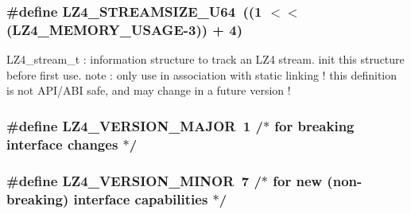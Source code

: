 \subsubsection[{L\+Z4\+\_\+\+S\+T\+R\+E\+A\+M\+S\+I\+Z\+E\+\_\+\+U64}]{\setlength{\rightskip}{0pt plus 5cm}\#define L\+Z4\+\_\+\+S\+T\+R\+E\+A\+M\+S\+I\+Z\+E\+\_\+\+U64~((1 $<$$<$ ({\bf L\+Z4\+\_\+\+M\+E\+M\+O\+R\+Y\+\_\+\+U\+S\+A\+G\+E}-\/3)) + 4)}\label{compat-lz4_8h_acddbce79f3e1d413f295e97d986ab3f5}
L\+Z4\+\_\+stream\+\_\+t \+: information structure to track an L\+Z4 stream. init this structure before first use. note \+: only use in association with static linking ! this definition is not A\+P\+I/\+A\+B\+I safe, and may change in a future version ! \hypertarget{compat-lz4_8h_a4a15eb1f8aa69834f917a50d7652413e}{}
\subsubsection[{L\+Z4\+\_\+\+V\+E\+R\+S\+I\+O\+N\+\_\+\+M\+A\+J\+O\+R}]{\setlength{\rightskip}{0pt plus 5cm}\#define L\+Z4\+\_\+\+V\+E\+R\+S\+I\+O\+N\+\_\+\+M\+A\+J\+O\+R~1    /$\ast$ for breaking interface changes  $\ast$/}\label{compat-lz4_8h_a4a15eb1f8aa69834f917a50d7652413e}
\hypertarget{compat-lz4_8h_af16952f74f68ac445da9fc7603609909}{}
\subsubsection[{L\+Z4\+\_\+\+V\+E\+R\+S\+I\+O\+N\+\_\+\+M\+I\+N\+O\+R}]{\setlength{\rightskip}{0pt plus 5cm}\#define L\+Z4\+\_\+\+V\+E\+R\+S\+I\+O\+N\+\_\+\+M\+I\+N\+O\+R~7    /$\ast$ for new (non-\/breaking) interface capabilities $\ast$/}\label{compat-lz4_8h_af16952f74f68ac445da9fc7603609909}
\hypertarget{compat-lz4_8h_aac7e910a11c45364a8b235d0d43a0265}{}
